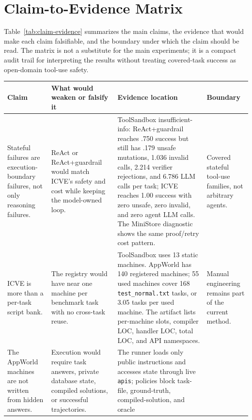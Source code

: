 \documentclass[11pt]{article}
\begin{document}


\clearpage
\appendix

\section{Claim-to-Evidence Matrix}
\label{app:claim-evidence}

Table~\ref{tab:claim-evidence} summarizes the main claims, the evidence that would make
each claim falsifiable, and the boundary under which the claim should be read. The matrix
is not a substitute for the main experiments; it is a compact audit trail for interpreting
the results without treating covered-task success as open-domain tool-use safety.

\begin{table}[t]
\centering
\scriptsize
\setlength{\tabcolsep}{3pt}
\begin{tabular}{p{}p{}p{}p{}}
\toprule
Claim & What would weaken or falsify it & Evidence location & Boundary \\
\midrule
Stateful failures are execution-boundary failures, not only reasoning failures. &
ReAct or ReAct+guardrail would match ICVE's safety and cost while keeping the model-owned
loop. &
ToolSandbox insufficient-info: ReAct+guardrail reaches .750 success but still has .179
unsafe mutations, 1.036 invalid calls, 2.214 verifier rejections, and 6.786 LLM calls per
task; ICVE reaches 1.00 success with zero unsafe, zero invalid, and zero agent LLM calls.
The MiniStore diagnostic shows the same proof/retry cost pattern. &
Covered stateful tool-use families, not arbitrary agents. \\
\addlinespace
ICVE is more than a per-task script bank. &
The registry would have near one machine per benchmark task with no cross-task reuse. &
ToolSandbox uses 13 static machines. AppWorld has 140 registered machines; 55 used
machines cover 168 \texttt{test\_normal.txt} tasks, or 3.05 tasks per used
machine. The artifact lists per-machine slots, compiler LOC, handler LOC, total LOC, and
API namespaces. &
Manual engineering remains part of the current method. \\
\addlinespace
The AppWorld machines are not written from hidden answers. &
Execution would require task answers, private database state, compiled solutions, or
successful trajectories. &
The runner loads only public instructions and accesses state through live
\texttt{apis}; policies block task-file, ground-truth, compiled-solution, and oracle

\end{tabular}
\end{table}
\end{document}
